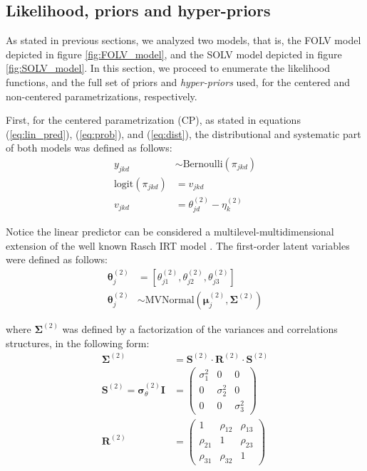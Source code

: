 \subsection{Likelihood, priors and hyper-priors}

As stated in previous sections, we analyzed two models, that is, the FOLV model depicted in figure \ref{fig:FOLV_model}, and the SOLV model depicted in figure \ref{fig:SOLV_model}. In this section, we proceed to enumerate the likelihood functions, and the full set of priors and \textit{hyper-priors} used, for the centered and non-centered parametrizations, respectively.

First, for the centered parametrization (CP), as stated in equations (\ref{eq:lin_pred}), (\ref{eq:prob}), and (\ref{eq:dist}), the distributional and systematic part of both models was defined as follows:
%
\begin{align}
	y_{jkd} &\sim \text{Bernoulli}( \pi_{jkd} ) \\
%
	\text{logit}( \pi_{jkd} ) &= v_{jkd} \\
	v_{jkd} &= \theta^{(2)}_{jd} - \eta^{(2)}_{k}
\end{align}

Notice the linear predictor can be considered a multilevel-multidimensional extension of the well known Rasch IRT model \cite{Rasch_1980}. The first-order latent variables were defined as follows:
%
\begin{align}
	\boldsymbol{\theta}^{(2)}_{j} &= \left[ \theta_{j1}^{(2)}, \theta_{j2}^{(2)}, \theta_{j3}^{(2)} \right] \\
	\boldsymbol{\theta}^{(2)}_{j} &\sim \text{MVNormal} \left( \boldsymbol{\mu}^{(2)}_{j}, \boldsymbol{\Sigma}^{(2)} \right) \label{eq:theta_sub}
\end{align}

\noindent where $\boldsymbol{\Sigma}^{(2)}$ was defined by a factorization of the variances and correlations structures, in the following form:
%
\begin{align} \label{eq:sigma_factoring}
	\boldsymbol{\Sigma}^{(2)} &= \boldsymbol{S}^{(2)} \cdot \boldsymbol{R}^{(2)} \cdot \boldsymbol{S}^{(2)} \\
	\boldsymbol{S}^{(2)} = \pmb{\sigma}^{(2)}_{\theta} \mathbf{I} &= 
	\begin{pmatrix}
		\sigma^{2}_{1}	& 0 			 	& 0 				\\
		0 				& \sigma^{2}_{2} 	& 0 				\\
		0 				& 0					& \sigma^{2}_{3} 
	\end{pmatrix} \label{eq:sigmas}\\
	\boldsymbol{R}^{(2)} &= 
	\begin{pmatrix}
		1			& \rho_{12} & \rho_{13} 	\\
		\rho_{21} 	& 1 		& \rho_{23} 	\\
		\rho_{31} 	& \rho_{32}	& 1	
	\end{pmatrix} 
\end{align}

